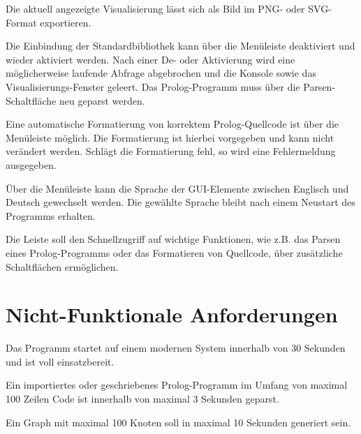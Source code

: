 \documentclass[parskip=full,11pt,twoside]{scrartcl}
\begin{document}
Die aktuell angezeigte Visualisierung lässt sich als Bild im PNG- oder SVG-Format exportieren.


Die Einbindung der Standardbibliothek kann über die Menüleiste deaktiviert und wieder aktiviert werden. Nach einer De- oder Aktivierung wird eine möglicherweise laufende Abfrage abgebrochen und die Konsole sowie das Visualisierungs-Fenster geleert. Das Prolog-Programm muss über die Parsen-Schaltfläche neu geparst werden.


Eine automatische Formatierung von korrektem Prolog-Quellcode ist über die Menüleiste möglich. Die Formatierung ist hierbei vorgegeben und kann nicht verändert werden. Schlägt die Formatierung fehl, so wird eine Fehlermeldung ausgegeben.


Über die Menüleiste kann die Sprache der GUI-Elemente zwischen Englisch und Deutsch gewechselt werden. Die gewählte Sprache bleibt nach einem Neustart des Programms erhalten.


Die Leiste soll den Schnellzugriff auf wichtige Funktionen, wie z.B. das Parsen eines Prolog-Programms oder das Formatieren von Quellcode, über zusätzliche Schaltflächen ermöglichen.

\section{Nicht-Funktionale Anforderungen}


Das Programm startet auf einem modernen System innerhalb von 30 Sekunden und ist voll einsatzbereit.


Ein importiertes oder geschriebenes Prolog-Programm im Umfang von maximal 100 Zeilen Code ist innerhalb von maximal 3 Sekunden geparst.


Ein Graph mit maximal 100 Knoten soll in maximal 10 Sekunden generiert sein.
\end{document}
